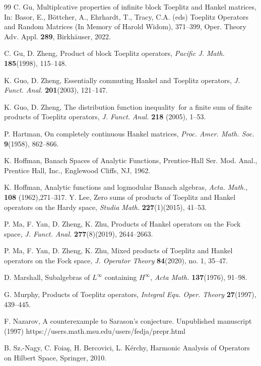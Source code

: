 \documentclass{article}%
\begin{document}
\begin{thebibliography}{99}
C. Gu, Multiplcative properties of infinite block Toeplitz and
Hankel matrices, In: Basor, E., B\"{o}ttcher, A., Ehrhardt, T., Tracy, C.A. (eds) Toeplitz Operators and Random Matrices (In Memory of Harold Widom), 371--399, Oper. Theory Adv. Appl. \textbf{289}, Birkh\"{a}user, 2022.

C. Gu, D. Zheng, Product of block Toeplitz operators,
\textsl{Pacific J. Math.} \textbf{185}(1998), 115--148.

K. Guo, D. Zheng, Essentially commuting Hankel and Toeplitz
operators, \textsl{J. Funct. Anal.} \textbf{201}(2003), 121--147.

K. Guo, D. Zheng, The distribution function inequality\ for a
finite sum of finite products of Toeplitz operators, \textsl{J. Funct. Anal.}
\textbf{218} (2005), 1--53.

P. Hartman, On completely continuous Hankel matrices,
\textsl{Proc. Amer. Math. Soc.} \textbf{9}(1958), 862--866.

K. Hoffman, Banach Spaces of Analytic Functions,
Prentice-Hall Ser. Mod. Anal., Prentice Hall, Inc., Englewood Cliffs, NJ, 1962.

K. Hoffman, Analytic functions and logmodular Banach algebras, \textsl{Acta. Math.}, \textbf{108} (1962),271–317.
Y. Lee, Zero sums of products of Toeplitz and Hankel operators
on the Hardy space, \textsl{Studia Math.} \textbf{227}(1)(2015), 41--53.

P. Ma, F. Yan, D. Zheng, K. Zhu, Products of Hankel
operators on the Fock space, \textsl{J. Funct. Anal.} \textbf{277}(8)(2019), 2644--2663.

P. Ma, F. Yan, D. Zheng, K. Zhu, Mixed products of
Toeplitz and Hankel operators on the Fock space, \textsl{J. Operator Theory}
\textbf{84}(2020), no. 1, 35--47.

D. Marshall, Subalgebras of $L^{\infty}$ containing
$H^{\infty}$, \textsl{Acta Math.} \textbf{137}(1976), 91--98.

G. Murphy, Products of Toeplitz operators, \textsl{Integral
Equ. Oper. Theory} \textbf{27}(1997), 439--445.

 F. Nazarov, A counterexample to Sarason’s conjecture. Unpublished manuscript (1997) https://users.math.msu.edu/users/fedja/prepr.html


B. Sz.-Nagy, C. Foia\c{s}, H. Bercovici, L. K\'{e}rchy,
Harmonic Analysis of Operators on Hilbert Space, Springer, 2010.


\end{thebibliography}
\end{document}
